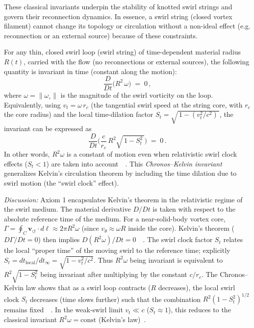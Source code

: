 \documentclass[aps,onecolumn,10pt,nofootinbib]{revtex4}
\newcommand{\swirlarrow}{\circlearrowleft} %
\newcommand{\vswirl}{\mathbf{v}_{\!\swirlarrow}}     %
\begin{document}
	These classical invariants underpin the stability of knotted swirl strings and govern their reconnection dynamics. In essence, a swirl string (closed vortex filament) cannot change its topology or circulation without a non-ideal effect (e.g. reconnection or an external source) because of these constraints.

	\begin{tcolorbox}[title=Axiom 1: Chronos–Kelvin Invariant]
		For any thin, closed swirl loop (swirl string) of time-dependent material radius $R(t)$, carried with the flow (no reconnections or external sources), the following quantity is invariant in time (constant along the motion):
		\[
			\frac{D}{Dt}\!\Big( R^2\,\omega \Big) \;=\; 0\,,
		\]
		where $\omega = \|\omega_{\circ}\|$ is the magnitude of the swirl vorticity on the loop. Equivalently, using $v_t = \omega\,r_c$ (the tangential swirl speed at the string core, with $r_c$ the core radius) and the local time-dilation factor $S_t = \sqrt{\,1 - (v_t^2/c^2)\,}$, the invariant can be expressed as
		\[
			\frac{D}{Dt}\!\Big( \frac{c}{r_c}\,R^2 \sqrt{\,1 - S_t^2\,}\Big) \;=\; 0\,.
		\]
		In other words, $R^2 \omega$ is a constant of motion even when relativistic swirl clock effects ($S_t<1$) are taken into account~\cite{index36}~\cite{index37}. This \emph{Chronos–Kelvin invariant} generalizes Kelvin’s circulation theorem by including the time dilation due to swirl motion (the “swirl clock” effect).
	\end{tcolorbox}

	\noindent \textit{Discussion:} Axiom 1 encapsulates Kelvin’s theorem in the relativistic regime of the swirl medium. The material derivative $D/Dt$ is taken with respect to the absolute reference time of the medium. For a near-solid-body vortex core, $\Gamma = \oint_C \vswirl\cdot d\ell \approx 2\pi R^2 \omega$ (since $v_{\theta}\approx \omega R$ inside the core). Kelvin’s theorem ($D\Gamma/Dt=0$) then implies $D(R^2 \omega)/Dt=0$~\cite{index38}~\cite{index39}. The swirl clock factor $S_t$ relates the local “proper time” of the moving swirl to the reference time; explicitly $S_t = dt_{\text{local}}/dt_{\infty} = \sqrt{1 - v_t^2/c^2}$. Thus $R^2 \omega$ being invariant is equivalent to $R^2 \sqrt{1 - S_t^2}$ being invariant after multiplying by the constant $c/r_c$. The Chronos–Kelvin law shows that as a swirl loop contracts ($R$ decreases), the local swirl clock $S_t$ decreases (time slows further) such that the combination $R^2 (1-S_t^2)^{1/2}$ remains fixed~\cite{index40}~\cite{index41}. In the weak-swirl limit $v_t \ll c$ ($S_t\approx 1$), this reduces to the classical invariant $R^2 \omega = \text{const}$ (Kelvin’s law)~\cite{index42}.
\end{document}
